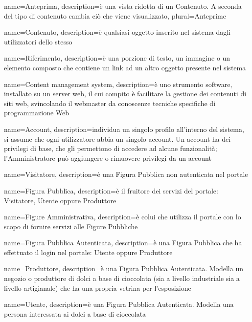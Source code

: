 {
    name={Anteprima},
    description={è una vista ridotta di un Contenuto. A seconda del tipo di contenuto cambia ciò che viene visualizzato},
    plural=Anteprime
}


{
    name={Contenuto},
    description={è qualsiasi oggetto inserito nel sistema dagli utilizzatori dello stesso}
}

{
    name={Riferimento},
    description={è una porzione di testo, un immagine o un elemento composto che contiene un link ad un altro oggetto presente nel sistema}
}

{
    name={Content management system},
    description={è uno strumento software, installato su un server web, il cui
        compito è facilitare la gestione dei contenuti di siti web, svincolando il
        webmaster da conoscenze tecniche specifiche di programmazione Web}
}


{
    name={Account},
    description={individua un singolo profilo all'interno del sistema, si assume che ogni utilizzatore abbia un singolo account. Un account ha dei privilegi di base, che gli permettono di accedere ad alcune funzionalità; l'Amministratore può aggiungere o rimuovere privilegi da un account}
}

{
    name={Visitatore},
    description={è una Figura Pubblica non autenticata nel portale}
}

{
    name={Figura Pubblica},
    description={è il fruitore dei servizi del portale: Visitatore, Utente oppure Produttore}
}

{
    name={Figure Amministrativa},
    description={è colui che utilizza il portale con lo scopo di fornire servizi alle Figure Pubbliche}
}

{
    name={Figura Pubblica Autenticata},
    description={è una Figura Pubblica che ha effettuato il login nel portale: Utente oppure Produttore}
}

{
    name={Produttore},
    description={è una Figura Pubblica Autenticata. Modella un negozio o produttore di dolci a base di cioccolata (sia a livello industriale sia a livello artigianale) che ha una propria vetrina per l'esposizione}
}

{
    name={Utente},
    description={è una Figura Pubblica Autenticata. Modella una persona interessata ai dolci a base di cioccolata}
}

